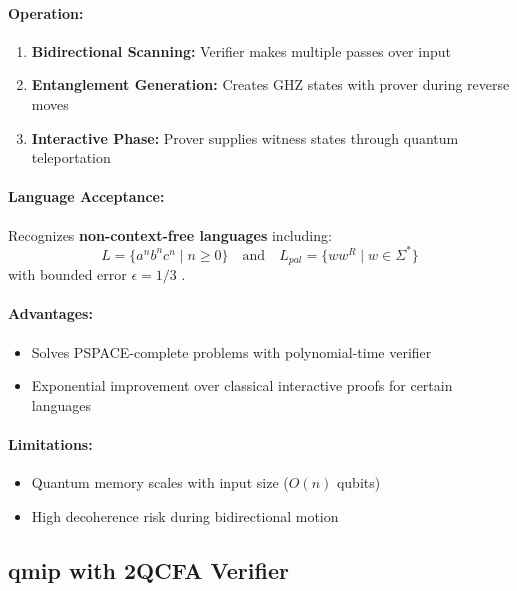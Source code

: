 \paragraph{Operation:}
\begin{enumerate}
    \item \textbf{Bidirectional Scanning:} Verifier makes multiple passes over input
    \item \textbf{Entanglement Generation:} Creates GHZ states with prover during reverse moves
    \item \textbf{Interactive Phase:} Prover supplies witness states through quantum teleportation
\end{enumerate}

\paragraph{Language Acceptance:}
Recognizes \textbf{non-context-free languages} including:
\[
L = \{a^nb^nc^n \mid n \geq 0\} \quad \text{and} \quad L_{pal} = \{ww^R \mid w \in \Sigma^*\}
\]
with bounded error $\epsilon = 1/3$ \cite{zheng2015power}.

\paragraph{Advantages:}
\begin{itemize}
    \item Solves PSPACE-complete problems with polynomial-time verifier
    \item Exponential improvement over classical interactive proofs for certain languages
\end{itemize}

\paragraph{Limitations:}
\begin{itemize}
    \item Quantum memory scales with input size ($O(n)$ qubits)
    \item High decoherence risk during bidirectional motion
\end{itemize}

\subsection{\acrfull{qmip} with 2QCFA Verifier}
\label{subsec:qmip2qcfa}

